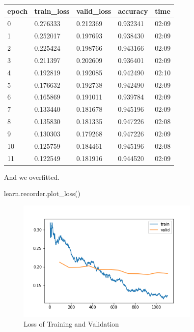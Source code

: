 \documentclass{ctexart}
\newenvironment{monos}{\VerbatimEnvironment\begin{pythoncode}}{\end{pythoncode}}
\begin{document}
\begin{longtable}[]{@{}lllll@{}}
    \toprule()
    epoch & train\_loss & valid\_loss & accuracy & time  \\
    \midrule()
    \endhead
    0     & 0.276333    & 0.212369    & 0.932341 & 02:09 \\
    1     & 0.252017    & 0.197693    & 0.938430 & 02:09 \\
    2     & 0.225424    & 0.198766    & 0.943166 & 02:09 \\
    3     & 0.211397    & 0.202609    & 0.936401 & 02:09 \\
    4     & 0.192819    & 0.192085    & 0.942490 & 02:10 \\
    5     & 0.176632    & 0.192738    & 0.942490 & 02:09 \\
    6     & 0.165869    & 0.191011    & 0.939784 & 02:09 \\
    7     & 0.133440    & 0.181678    & 0.945196 & 02:09 \\
    8     & 0.135830    & 0.181335    & 0.947226 & 02:08 \\
    9     & 0.130303    & 0.179268    & 0.947226 & 02:09 \\
    10    & 0.125759    & 0.184461    & 0.945196 & 02:08 \\
    11    & 0.122549    & 0.181916    & 0.944520 & 02:09 \\
    \bottomrule()
\end{longtable}


And we overfitted.


\begin{monos}
learn.recorder.plot_loss()
\end{monos}

\begin{figure}[H]
    \centering
    \includegraphics[width=0.8\textwidth]{assets/train_loss.png}
    \caption{Loss of Training and Validation}
    \label{fig:loss}
\end{figure}
\end{document}
